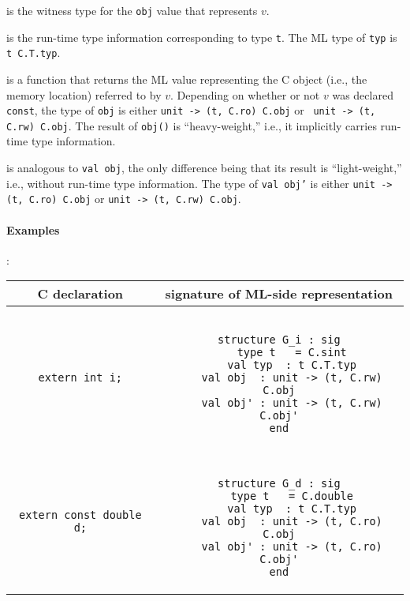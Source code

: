 \documentclass[titlepage,letterpaper]{article}
\begin{document}
\begin{description}\setlength{\itemsep}{0pt}
\item[{\tt type t}] is the witness type for the {\tt obj}
  value that represents $v$.
\item[{\tt val typ}] is the run-time type information corresponding to
  type {\tt t}.  The ML type of {\tt typ} is {\tt t C.T.typ}.
\item[{\tt val obj}] is a function that returns the ML value
  representing the C object (i.e., the memory location) referred to by
  $v$.  Depending on whether or not $v$ was declared {\tt const}, the
  type of {\tt obj} is either {\tt unit -> (t, C.ro) C.obj} or {\tt
    unit -> (t, C.rw) C.obj}.  The result of {\tt obj()} is
  ``heavy-weight,'' i.e., it implicitly carries run-time type
  information.
\item[{\tt val obj'}] is analogous to {\tt val obj}, the only
  difference being that its result is ``light-weight,'' i.e., without
  run-time type information.  The type of {\tt val obj'} is
  either {\tt unit -> (t, C.ro) C.obj} or {\tt unit -> (t, C.rw) C.obj}.
\end{description}

\paragraph*{Examples}:

\begin{center}
\begin{tabular}{c|c}
C declaration & signature of ML-side representation \\ \hline\hline
{\tt extern int i;}
&
\begin{minipage}{4in}
\begin{verbatim}

structure G_i : sig
    type t   = C.sint
    val typ  : t C.T.typ
    val obj  : unit -> (t, C.rw) C.obj
    val obj' : unit -> (t, C.rw) C.obj'
end

\end{verbatim}
\end{minipage}
\\ \hline
{\tt extern const double d;}
&
\begin{minipage}{4in}
\begin{verbatim}

structure G_d : sig
    type t   = C.double
    val typ  : t C.T.typ
    val obj  : unit -> (t, C.ro) C.obj
    val obj' : unit -> (t, C.ro) C.obj'
end

\end{verbatim}
\end{minipage}
\end{tabular}
\end{center}

%


\end{document}
